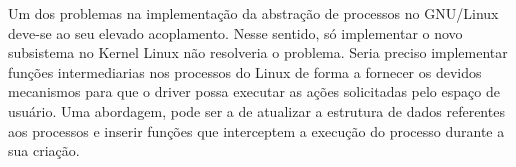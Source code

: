 

Um dos problemas na implementação da abstração de processos no GNU/Linux
deve-se ao seu elevado acoplamento. Nesse sentido, só implementar o novo
subsistema no Kernel Linux não resolveria o problema. Seria preciso implementar
funções intermediarias nos processos do Linux de forma a fornecer os devidos
mecanismos para que o driver possa executar as ações solicitadas pelo espaço de
usuário. Uma abordagem, pode ser a de atualizar a estrutura de dados referentes
aos processos e inserir funções que interceptem a execução do processo durante
a sua criação.

